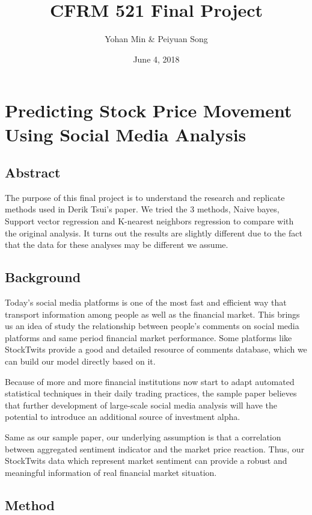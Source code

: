 \documentclass[]{article}
\title{CFRM 521 Final Project}
\author{Yohan Min \& Peiyuan Song}
\date{June 4, 2018}
\begin{document}
\maketitle

\section{Predicting Stock Price Movement Using Social Media
Analysis}\label{predicting-stock-price-movement-using-social-media-analysis}

\subsection{Abstract}\label{abstract}

The purpose of this final project is to understand the research and
replicate methods used in Derik Tsui's paper. We tried the 3 methods,
Naive bayes, Support vector regression and K-nearest neighbors
regression to compare with the original analysis. It turns out the
results are slightly different due to the fact that the data for these
analyses may be different we assume.

\subsection{Background}\label{background}

Today's social media platforms is one of the most fast and efficient way
that transport information among people as well as the financial market.
This brings us an idea of study the relationship between people's
comments on social media platforms and same period financial market
performance. Some platforms like StockTwits provide a good and detailed
resource of comments database, which we can build our model directly
based on it.

Because of more and more financial institutions now start to adapt
automated statistical techniques in their daily trading practices, the
sample paper believes that further development of large-scale social
media analysis will have the potential to introduce an additional source
of investment alpha.

Same as our sample paper, our underlying assumption is that a
correlation between aggregated sentiment indicator and the market price
reaction. Thus, our StockTwits data which represent market sentiment can
provide a robust and meaningful information of real financial market
situation.

\subsection{Method}\label{method}
\end{document}
